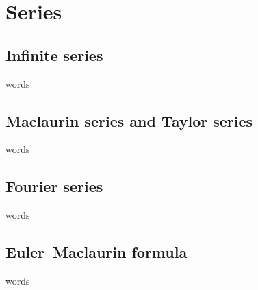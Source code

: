 \chapter{Series}


\section{Infinite series}
words

\section{Maclaurin series and Taylor series}
words

\section{Fourier series}
words

\section{Euler–Maclaurin formula}
words




